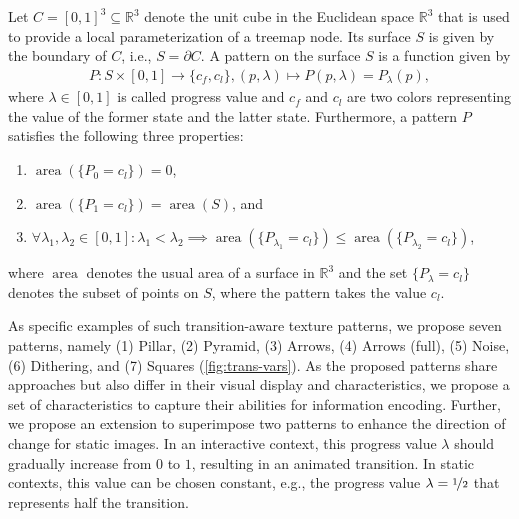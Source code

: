 \documentclass[smallextended,natbib]{svjour3}       %
\DeclareMathOperator{\area}{area}
\begin{document}
Let $C = [0,1]^3 \subseteq \mathbb{R}^3$ denote the unit cube in the Euclidean space $\mathbb{R}^3$ that is used to provide a local parameterization of a treemap node.
Its surface $S$ is given by the boundary of $C$, i.e., $S = \partial C$. 
A pattern on the surface $S$ is a function given by 
\begin{align*}
    P: S \times [0,1] \to \{c_f, c_l \}, (p, \lambda) \mapsto P(p, \lambda) = P_{\lambda}(p),
\end{align*}
where $\lambda \in [0,1]$ is called progress value and $c_f$ and $c_l$ are two colors representing the value of the former state and the latter state.
Furthermore, a pattern $P$ satisfies the following three properties:
\begin{enumerate}
    \item $\area(\{P_0 = c_l \}) = 0$,
    \item $\area(\{P_1 = c_l \}) = \area(S)$, and
    \item  $\forall \lambda_1, \lambda_2 \in [0,1]: \lambda_1 < \lambda_2 \implies \area(\{P_{\lambda_1} = c_{l}\}) \leq \area(\{P_{\lambda_2} = c_{l}\})$,
\end{enumerate}
where $\area$ denotes the usual area of a surface in $\mathbb{R}^3$ and the set $\{P_{\lambda} = c_{l}\}$ denotes the subset of points on $S$, where the pattern takes the value $c_l$.

As specific examples of such transition-aware texture patterns, we propose seven patterns, namely (1) Pillar, (2) Pyramid, (3) Arrows, (4) Arrows (full), (5) Noise, (6) Dithering, and (7) Squares (\autoref{fig:trans-vars}).
As the proposed patterns share approaches but also differ in their visual display and characteristics, we propose a set of characteristics to capture their abilities for information encoding.
Further, we propose an extension to superimpose two patterns to enhance the direction of change for static images.
In an interactive context, this progress value $\lambda$ should gradually increase from $0$ to $1$, resulting in an animated transition.
In static contexts, this value can be chosen constant, e.g., the progress value $\lambda = \nicefrac{1}{2}$ that represents half the transition.
\end{document}
